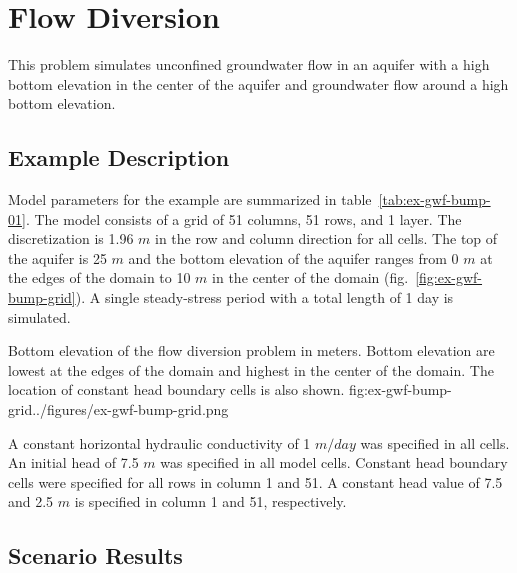 \section{Flow Diversion}

This problem simulates unconfined groundwater flow in an aquifer with a high bottom elevation in the center of the aquifer and groundwater flow around a high bottom elevation.

\subsection{Example Description}
Model parameters for the example are summarized in table~\ref{tab:ex-gwf-bump-01}. The model consists of a grid of 51 columns, 51 rows, and 1 layer. The discretization is 1.96 $m$ in the row and column direction for all cells. The top of the aquifer is 25 $m$ and the bottom elevation of the aquifer ranges from 0 $m$ at the edges of the domain to 10 $m$ in the center of the domain (fig.~\ref{fig:ex-gwf-bump-grid}). A single steady-stress period with a total length of 1 day is simulated.


\begin{StandardFigure}{
                                     Bottom elevation of the flow diversion problem in meters. Bottom elevation are lowest at 
                                     the edges of the domain and highest in the center of the domain. The location of constant
                                     head boundary cells is also shown.
                                     }{fig:ex-gwf-bump-grid}{../figures/ex-gwf-bump-grid.png}
\end{StandardFigure}                                 




A constant horizontal hydraulic conductivity of 1 $m/day$ was specified in all cells. An initial head of 7.5 $m$ was specified in all model cells. Constant head boundary cells were specified for all rows in column 1 and 51. A constant head value of 7.5 and 2.5 $m$ is specified in column 1 and 51, respectively.


\subsection{Scenario Results}

